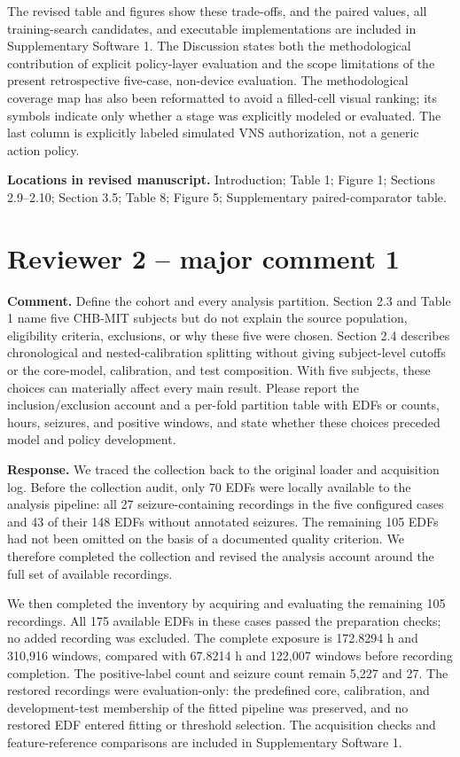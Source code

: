 \documentclass[11pt,a4paper]{article}
\begin{document}
The revised table and figures show these trade-offs, and the paired values, all training-search candidates, and executable implementations are included in Supplementary Software 1. The Discussion states both the methodological contribution of explicit policy-layer evaluation and the scope limitations of the present retrospective five-case, non-device evaluation. The methodological coverage map has also been reformatted to avoid a filled-cell visual ranking; its symbols indicate only whether a stage was explicitly modeled or evaluated. The last column is explicitly labeled simulated VNS authorization, not a generic action policy.

\textbf{Locations in revised manuscript.} Introduction; Table 1; Figure 1; Sections 2.9--2.10; Section 3.5; Table 8; Figure 5; Supplementary paired-comparator table.

\section*{Reviewer 2 -- major comment 1}

\textbf{Comment.} Define the cohort and every analysis partition. Section 2.3 and Table 1 name five CHB-MIT subjects but do not explain the source population, eligibility criteria, exclusions, or why these five were chosen. Section 2.4 describes chronological and nested-calibration splitting without giving subject-level cutoffs or the core-model, calibration, and test composition. With five subjects, these choices can materially affect every main result. Please report the inclusion/exclusion account and a per-fold partition table with EDFs or counts, hours, seizures, and positive windows, and state whether these choices preceded model and policy development.

\textbf{Response.} We traced the collection back to the original loader and acquisition log. Before the collection audit, only 70 EDFs were locally available to the analysis pipeline: all 27 seizure-containing recordings in the five configured cases and 43 of their 148 EDFs without annotated seizures. The remaining 105 EDFs had not been omitted on the basis of a documented quality criterion. We therefore completed the collection and revised the analysis account around the full set of available recordings.

We then completed the inventory by acquiring and evaluating the remaining 105 recordings. All 175 available EDFs in these cases passed the preparation checks; no added recording was excluded. The complete exposure is 172.8294 h and 310,916 windows, compared with 67.8214 h and 122,007 windows before recording completion. The positive-label count and seizure count remain 5,227 and 27. The restored recordings were evaluation-only: the predefined core, calibration, and development-test membership of the fitted pipeline was preserved, and no restored EDF entered fitting or threshold selection. The acquisition checks and feature-reference comparisons are included in Supplementary Software 1.
\end{document}
